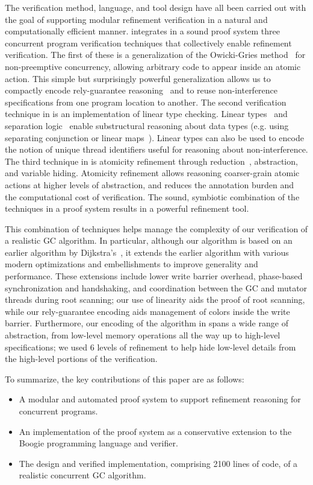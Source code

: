 The verification method, language, and tool design have all been carried out with the goal of supporting  modular refinement 
verification in a natural and computationally efficient manner. 
\civl integrates in a sound proof system three concurrent program verification techniques that collectively enable refinement verification. 
The first of these is a generalization of the Owicki-Gries method~\cite{OwickiG76} for non-preemptive concurrency, 
allowing arbitrary code to appear inside an atomic action. 
This simple but surprisingly powerful generalization allows us to compactly encode rely-guarantee reasoning~\cite{Jones83}
and to reuse non-interference specifications from one program location to another.
The second verification technique in \civl is an implementation of linear type checking.
Linear types~\cite{Wadler90lineartypes} and separation logic~\cite{Reynolds02} enable substructural reasoning about data types
(e.g. using separating conjunction or linear maps~\cite{LahiriQW11}).
Linear types can also be used to encode the notion of unique thread identifiers useful for reasoning about non-interference. 
The third technique in \civl is atomicity refinement through reduction~\cite{Lipton75}, abstraction, and variable hiding. 
Atomicity refinement allows reasoning coarser-grain atomic actions at higher levels of abstraction, 
and reduces the annotation burden and the computational cost of verification. 
The sound, symbiotic combination of the techniques in a proof system results in a powerful refinement tool. 

This combination of techniques helps manage the complexity of our verification of a realistic GC algorithm.  
In particular, although our algorithm is based on an earlier algorithm by Dijkstra's~\cite{dijk78}, 
it extends the earlier algorithm with various modern optimizations and embellishments to improve generality and performance.  
These extensions include lower write barrier overhead, phase-based synchronization and handshaking, 
and coordination between the GC and mutator threads during root scanning; our use of linearity aids the proof of root scanning, 
while our rely-guarantee encoding aids management of colors inside the write barrier.  
Furthermore, our encoding of the algorithm in \civl spans a wide range of abstraction, 
from low-level memory operations all the way up to high-level specifications; 
we used 6 levels of refinement to help hide low-level details from the high-level portions of the verification.

To summarize, the key contributions of this paper are as follows:
\begin{itemize}
\item 
A modular and automated proof system to support refinement reasoning for concurrent programs.
\item 
An implementation of the proof system as a conservative extension to the Boogie programming language and verifier.
\item 
The design and verified implementation, comprising 2100 lines of code, of a realistic concurrent GC algorithm.
\end{itemize}



